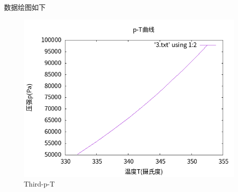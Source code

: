 \documentclass[11pt]{report}
\begin{document}
\begin{enumerate}
数据绘图如下
\begin{figure}[htbp]
\centering
\includegraphics[width=.9\linewidth]{../data/3.png}
\caption{Third-p-T}
\end{figure}
\end{enumerate}
\end{document}
